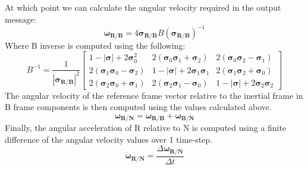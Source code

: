 \documentclass[]{AVSSimReportMemo}
\begin{document}
At which point we can calculate the angular velocity required in the output message:
\begin{equation}
	\label{eq: omegaRB}
	\bm{\omega_{R/B}} = 4\bm{\dot{\sigma}_{R/B}}B(\bm{{\sigma}_{R/B}})^{-1}
\end{equation}
Where B inverse is computed using the following:
\begin{equation}B^{-1} = \frac{1}{|\bm{\sigma_{R/B}}|^2}
\begin{bmatrix}
    1 - |\bm{\sigma}| + 2 \bm{\sigma}_0^2     & 2  (\bm{\sigma}_0  \bm{\sigma}_1 + \bm{\sigma}_2) &2  (\bm{\sigma}_0  \bm{\sigma}_2 - \bm{\sigma}_1) \\ 2  (\bm{\sigma}_1  \bm{\sigma}_0 - \bm{\sigma}_2) & 1 - |\bm{\sigma}| + 2  \bm{\sigma}_1 \bm{\sigma}_1 & 2 (\bm{\sigma}_1  \bm{\sigma}_2 + \bm{\sigma}_0)\\2  (\bm{\sigma}_2 \bm{\sigma}_0 + \bm{\sigma}_1) & 2 (\bm{\sigma}_2 \bm{\sigma}_1 - \bm{\sigma}_0) & 1 - |\bm{\sigma}| + 2 \bm{\sigma}_2 \bm{\sigma}_2
\end{bmatrix}
\end{equation}
The angular velocity of the reference frame vector relative to the inertial frame in B frame components is then computed using the values calculated above.
\begin{equation}
	\label{eq: omegaRN}
	\bm{\omega_{R/N}} = \bm{\omega_{R/B}} + \bm{\omega_{B/N}}
\end{equation}
Finally, the angular acceleration of R relative to N is computed using a finite difference of the angular velocity values over 1 time-step.
\begin{equation}
	\label{eq: domegaRN}
	\bm{\dot{\omega}_{R/N}} = \frac{\Delta\bm{\omega_{R/N}}}{\Delta t}
\end{equation}




\end{document}
